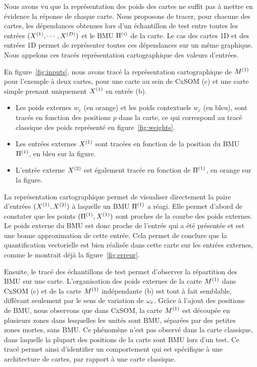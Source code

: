 \documentclass[../main]{subfiles}
\begin{document}
Nous avons vu que la représentation des poids des cartes ne suffit pas à mettre en évidence la réponse de chaque carte. Nous proposons de tracer, pour chacune des cartes, les dépendances obtenues lors d'un échantillon de test entre toutes les entrées $(X^{({1})}, \cdots, X^{({D})})$ et le BMU $\Pi^{({i})}$ de la carte. Le cas des cartes 1D et des entrées 1D permet de représenter toutes ces dépendances sur un même graphique.
Nous appelons ces tracés représentation cartographique des valeurs d'entrées.

En figure~\ref{fig:inputs}, nous avons tracé la représentation cartographique de $M^{({1})}$ pour l'exemple à deux cartes, pour une carte au sein de CxSOM (c) et une carte simple prenant uniquement $X^{({1})}$ en entrée (b).
\begin{itemize}
    \item Les poids externes $w_e$ (en orange) et les poids contextuels $w_c$ (en bleu), sont tracés en fonction des positions $p$ dans la carte, ce qui correspond au tracé classique des poids représenté en figure~\ref{fig:weights}.
    \item Les entrées externes $X^{({1})}$ sont tracées en fonction de la position du BMU $\Pi^{({1})}$, en bleu sur la figure.
    \item L'entrée externe $X^{({2})}$ est également tracée en fonction de $\Pi^{({1})}$, en orange sur la figure. 
\end{itemize}

La représentation cartographique permet de visualiser directement la paire d'entrées $(X^{({1})}, X^{({2})})$ à laquelle un BMU $\Pi^{({1})}$ a réagi.
Elle permet d'abord de constater que les points $(\Pi^{({1})},X^{({1})})$ sont proches de la courbe des poids externes. Le poids externe du BMU est donc proche de l'entrée qui a été présentée et est une bonne approximation de cette entrée. 
Cela permet de conclure que la quantification vectorielle est bien réalisée dans cette carte sur les entrées externes, comme le montrait déjà la figure~\ref{fig:erreur}.

Ensuite, le tracé des échantillons de test permet d'observer la répartition des BMU sur une carte. 
L'organisation des poids externes de la carte $M^{({1})}$ dans CxSOM (c) et de la carte $M^{({1})}$ indépendante (b) est tout à fait semblable, différant seulement par le sens de variation de $\omega_e$.
Grâce à l'ajout des positions de BMU, nous observons que dans CxSOM, la carte $M^{({1})}$ est découpée en plusieurs zones dans lesquelles les unités sont BMU, séparées par des petites zones mortes, sans BMU. Ce phénomène n'est pas observé dans la carte classique, dans laquelle la plupart des positions de la carte sont BMU lors d'un test. 
Ce tracé permet ainsi d'identifier un comportement qui est spécifique à une architecture de cartes, par rapport à une carte classique. 
\end{document}
